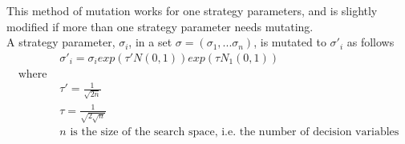 This method of mutation works for one strategy parameters, and is slightly modified if more than one strategy parameter needs mutating.
\\A strategy parameter, $\sigma_{i}$, in a set $\sigma = (\sigma_{1}, ... \sigma_{n})$, is mutated to $\sigma'_{i}$ as follows\cite{4-es, es}
\begin{equation}
  \begin{split}
    &\sigma'_{i} = \sigma_{i}exp(\tau'N(0, 1))exp(\tau N_{1}(0, 1)) \\
    \text{where } \\
    &\tau' = \frac{1}{\sqrt{2n}} \\
    &\tau = \frac{1}{\sqrt{2\sqrt{n}}} \\
    &n \text{ is the size of the search space, i.e. the number of decision variables}
  \end{split}
\end{equation}


